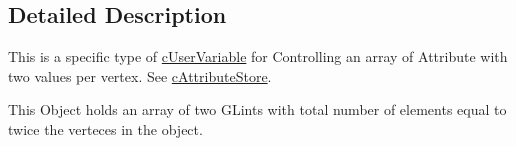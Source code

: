 \subsection{Detailed Description}
This is a specific type of \hyperlink{classc_user_variable}{cUserVariable} for Controlling an array of Attribute with two values per vertex. See \hyperlink{classc_attribute_store}{cAttributeStore}. 

This Object holds an array of two GLints with total number of elements equal to twice the verteces in the object. 